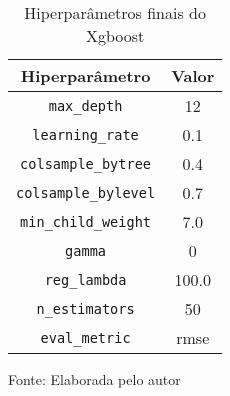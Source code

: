 
\begin{table}[h]
\centering
\caption{Hiperparâmetros finais do Xgboost}
\label{tab:cap3_parametros_xgboost}
\begin{tabular}{cc}
Hiperparâmetro & Valor \\
\hline
\verb|max_depth| & 12 \\
\verb|learning_rate| & 0.1 \\
\verb|colsample_bytree| & 0.4 \\
\verb|colsample_bylevel| & 0.7 \\
\verb|min_child_weight| & 7.0 \\
\verb|gamma| & 0 \\
\verb|reg_lambda| & 100.0 \\
\verb|n_estimators| & 50 \\
\verb|eval_metric| & rmse \\
\hline
\end{tabular}

Fonte: Elaborada pelo autor
\end{table}
